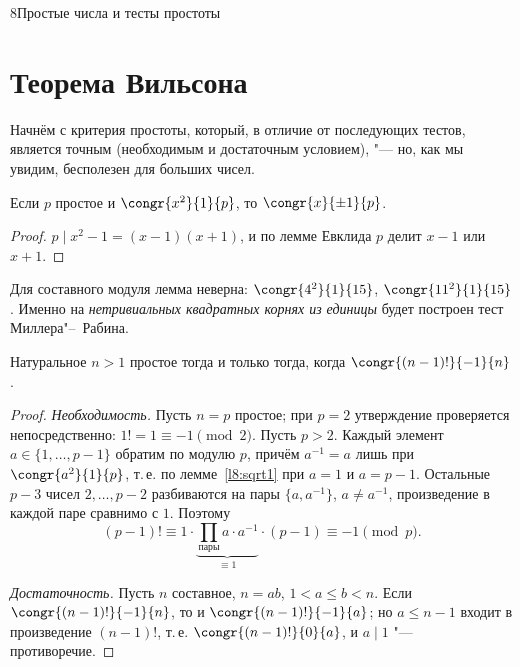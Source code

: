 \begin{lecture}{8}{Простые числа и тесты простоты}

\section{Теорема Вильсона}

Начнём с критерия простоты, который, в отличие от последующих тестов, является точным
(необходимым и достаточным условием), "--- но, как мы увидим, бесполезен для больших чисел.

\begin{lemma}\label{l8:sqrt1}
Если $p$ простое и $\congr{x^2}{1}{p}$, то $\congr{x}{\pm 1}{p}$.
\end{lemma}

\begin{proof}
$p \mid x^2 - 1 = (x - 1)(x + 1)$, и по лемме Евклида $p$ делит $x - 1$ или $x + 1$.
\end{proof}

Для составного модуля лемма неверна: $\congr{4^2}{1}{15}$, $\congr{11^2}{1}{15}$. Именно на
\emph{нетривиальных квадратных корнях из единицы} будет построен тест Миллера"--~Рабина.

\begin{theorem}\label{l8:wilson}
Натуральное $n > 1$ простое тогда и только тогда, когда $\congr{(n - 1)!}{-1}{n}$.
\end{theorem}

\begin{proof}
\emph{Необходимость.} Пусть $n = p$ простое; при $p = 2$ утверждение проверяется
непосредственно: $1! = 1 \equiv -1 \pmod 2$. Пусть $p > 2$. Каждый элемент
$a \in \{1, \ldots, p - 1\}$ обратим по модулю $p$, причём $a^{-1} = a$ лишь при
$\congr{a^2}{1}{p}$, т.\,е. по лемме~\ref{l8:sqrt1} при $a = 1$ и $a = p - 1$. Остальные $p - 3$
чисел $2, \ldots, p - 2$ разбиваются на пары $\{a, a^{-1}\}$, $a \ne a^{-1}$, произведение
в каждой паре сравнимо с $1$. Поэтому
\[
  (p - 1)! \equiv 1 \cdot \underbrace{\prod_{\text{пары}} a \cdot a^{-1}}_{\equiv 1} \cdot (p - 1)
  \equiv -1 \pmod p.
\]

\emph{Достаточность.} Пусть $n$ составное, $n = ab$, $1 < a \le b < n$. Если $\congr{(n - 1)!}{-1}{n}$,
то и $\congr{(n - 1)!}{-1}{a}$; но $a \le n - 1$ входит в произведение $(n - 1)!$, т.\,е.
$\congr{(n - 1)!}{0}{a}$, и $a \mid 1$ "--- противоречие.
\end{proof}


\end{lecture}
